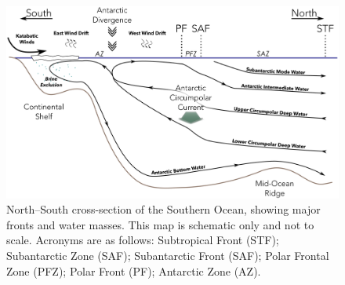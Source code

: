 \begin{figure}
  \centering
  \includegraphics[width=\textwidth]{../introduction/oceanographymap.png}
  \caption[Major fronts and water masses of the Southern Ocean]{North--South cross-section of the Southern Ocean, showing major fronts and water masses.
  This map is schematic only and not to scale.
  Acronyms are as follows: Subtropical Front (STF); Subantarctic Zone (SAF); Subantarctic Front (SAF); Polar Frontal Zone (PFZ); Polar Front (PF); Antarctic Zone (AZ).}
  \label{fig:oceanographymap}
\end{figure}
